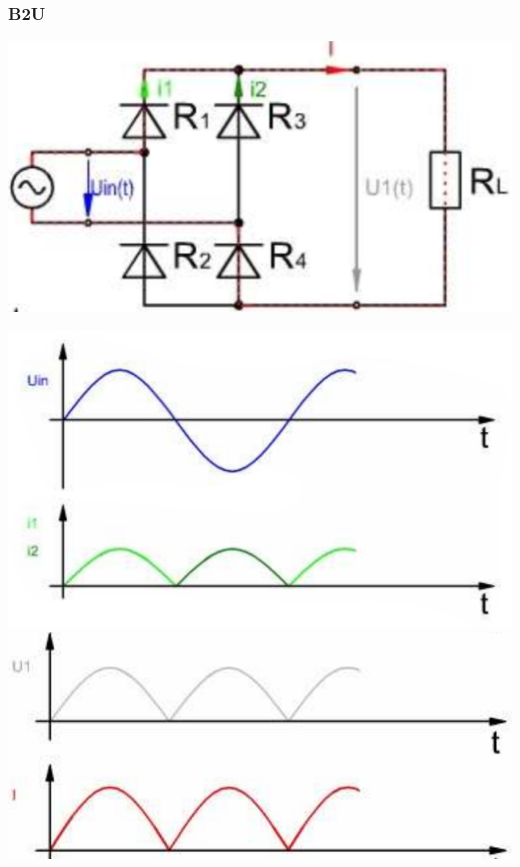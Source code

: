 \subsubsection{B2U}
\begin{minipage}{0.4\textwidth}
    \includegraphics[width=\linewidth]{images/PrakUGB2}
\end{minipage}
\begin{minipage}{0.25\linewidth}
    \centering
    \includegraphics[width=0.9\linewidth]{images/PrakUGB2Kl1}
    \includegraphics[width=0.9\linewidth]{images/PrakUGB2Kl2}
\end{minipage}
